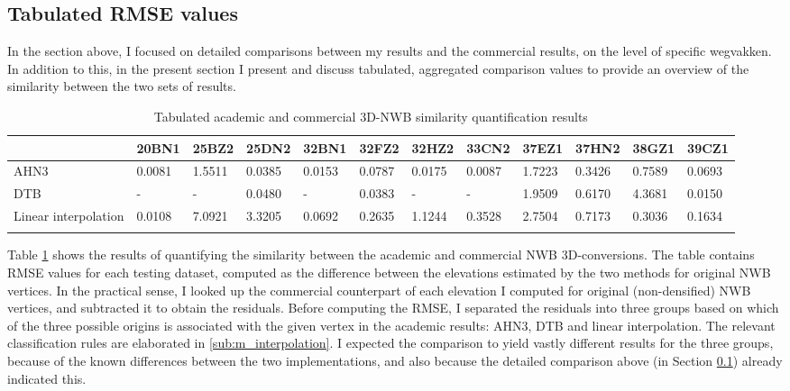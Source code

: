 \subsection{Tabulated RMSE values}
\label{sub:comparisonexamples}

In the section above, I focused on detailed comparisons between my results and the commercial results, on the level of specific wegvakken. In addition to this, in the present section I present and discuss tabulated, aggregated comparison values to provide an overview of the similarity between the two sets of results.

\begin{table}[]
\begin{tabular}{@{}llllllllllll@{}}
\toprule
\multicolumn{1}{c}{} & 20BN1  & 25BZ2  & 25DN2  & 32BN1  & 32FZ2   & 32HZ2  & 33CN2  & 37EZ1  & 37HN2  & 38GZ1  & 39CZ1  \\ \midrule
AHN3                 & 0.0081 & 1.5511 & 0.0385 & 0.0153 & 0.0787  & 0.0175 & 0.0087 & 1.7223 & 0.3426 & 0.7589 & 0.0693 \\
DTB                  & -      & -      & 0.0480 & -      & 0.0383  & -      & -      & 1.9509 & 0.6170 & 4.3681 & 0.0150 \\
Linear interpolation & 0.0108 & 7.0921 & 3.3205 & 0.0692 & 0.2635  & 1.1244 & 0.3528 & 2.7504 & 0.7173 & 0.3036 & 0.1634 \\ \bottomrule
\caption{Tabulated academic and commercial 3D-NWB similarity quantification results \label{tab:comparisontabulated}}
\end{tabular}
\end{table}

Table \ref{tab:comparisontabulated} shows the results of quantifying the similarity between the academic and commercial NWB 3D-conversions. The table contains RMSE values for each testing dataset, computed as the difference between the elevations estimated by the two methods for original NWB vertices. In the practical sense, I looked up the commercial counterpart of each elevation I computed for original (non-densified) NWB vertices, and subtracted it to obtain the residuals. Before computing the RMSE, I separated the residuals into three groups based on which of the three possible origins is associated with the given vertex in the academic results: AHN3, DTB and linear interpolation. The relevant classification rules are elaborated in \ref{sub:m_interpolation}. I expected the comparison to yield vastly different results for the three groups, because of the known differences between the two implementations, and also because the detailed comparison above (in Section \ref{sub:comparisonexamples}) already indicated this.


